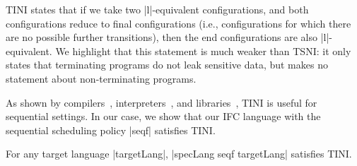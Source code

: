 TINI states that if we take two |l|-equivalent configurations, and both
configurations reduce to final configurations (i.e.,
configurations for which there are no
possible further transitions), then the end configurations are also
|l|-equivalent.
%
We highlight that this statement is much weaker than TSNI: it only states that
terminating programs do not leak sensitive data, but makes no statement
about non-terminating programs.

As shown by compilers~\cite{jif,FlowCaml}, interpreters~\cite{JSFlow}, and
libraries~\cite{Russo+:Haskell08,lio}, TINI is useful for sequential
settings. In our case, we show that our IFC language with the sequential scheduling policy
|seqf| satisfies TINI.
%
\begin{theorem}
  \label{thm:seq-tini}
For any target language |targetLang|, |specLang seqf targetLang| satisfies TINI.
\end{theorem}



